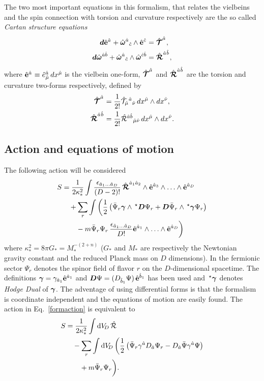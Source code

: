 The two most important equations in this formalism, that relates the vielbeins and the spin connection with torsion and curvature respectively are the so called {\it{Cartan structure equations}} 
\begin{align}
  \label{cartantorsion}
  \df\vifhn{a}{} + \wfh^{\hat{a}}{}_{\hat{c}}\wedge\vifhn{c}{} &= \Tfhn{a}{}, \\
  \label{cartancurvature}
  \df\wfh^{\hat{a}\hat{b}} + \wfh^{\hat{a}}{}_{\hat{c}}\wedge\wfh^{\hat{c}\hat{b}} &= \Rfhn{a}{}{b}{},
\end{align}
where $\hat{{\bf{e}}}^{\hat{a}_{}} \equiv \hat{e}^{\hat{a}}_{\hat{\mu}}\,dx^{\hat{\mu}}$ is the vielbein one-form, $\hat{{\boldsymbol{\mathcal{T}}}}^{\hat{a}_{}}$ and $\hat{{\boldsymbol{\mathcal{R}}}}^{\hat{a}_{}\hat{b}_{}}$ are the torsion and curvature two-forms respectively, defined by
\begin{align}
  \hat{{\boldsymbol{\mathcal{T}}}}^{\hat{a}_{}} &= \frac{1}{2!}\hat{\mathcal{T}}_{\hat{\mu}}{}^{\hat{a}}{}_{\hat{\nu}}\,dx^{\hat{\mu}}\wedge dx^{\hat{\nu}},\\
  \hat{{\boldsymbol{\mathcal{R}}}}^{\hat{a}_{}\hat{b}_{}} &= \frac{1}{2!}\hat{{\mathcal{R}}}^{\hat{a}\hat{b}}{}_{\hat{\mu}\hat{\nu}}\,dx^{\hat{\mu}}\wedge dx^{\hat{\nu}}.
\end{align}


\subsection{Action and equations of motion}
The following action will be considered
\begin{align}
  \nonumber
  S &= \frac{1}{2\kappa_*^2}\int\frac{\epsilon_{\hat{a}_1\ldots\hat{a}_D}}{(D-2)!}\,\Rfh^{\hat{a}_1\hat{a}_2}\wedge\vifh^{\hat{a}_3}\wedge\ldots\wedge\vifh^{\hat{a}_D} \\
  \nonumber
  &\quad+ \sum_{r}\int\bigg(\frac{1}{2}\left(\bar{\Psi}_r\gf\wedge\hodge\Df\Psi_r + \Df\bar{\Psi}_r\wedge\hodge\gf\Psi_r\right) \\
  \label{formaction}
  &\qquad- m\bar{\Psi}_r\Psi_r\,\frac{\epsilon_{\hat{a}_1\ldots\hat{a}_D}}{D!}\vifh^{\hat{a}_1}\wedge\ldots\wedge\vifh^{\hat{a}_D}\bigg)
\end{align}
where $\kappa_*^2 = 8\pi G_* = M_*^{-(2+n)}$ ($G_*$ and $M_*$ are  respectively the  Newtonian gravity constant and the reduced Planck mass on $D$ dimensions). In the fermionic sector $\Psi_r$ denotes the spinor field of flavor $r$ on the $D$-dimensional spacetime. The definitions ${\boldsymbol{\gamma}} = \gamma_{\hat{a}_1}\hat{{\bf{e}}}^{\hat{a}_1}$ and ${\boldsymbol{D}}\Psi = (D_{\hat{b}_1}\Psi)\,\hat{{\bf{e}}}^{\hat{b}_1}$ has been used and $\,{}^\star{\boldsymbol{\gamma}}$ denotes {\it{Hodge Dual}} of ${\boldsymbol{\gamma}}$. The adventage of using differential forms is that the formalism is coordinate independent and the equations of motion are easily found. The action in Eq.~\eqref{formaction} is equivalent to
\begin{align}
  \nonumber
  S &= \frac{1}{2\kappa_*^2}\int \dv[D]\,\hat{\R} \\ 
  \nonumber
  &\quad -\sum_{r}\int \dv[D]\,\bigg(\frac{1}{2}\left(\bar{\Psi}_r\gamma^{\hat{a}}D_{\hat{a}}\Psi_r - D_{\hat{a}}\bar{\Psi}\gamma^{\hat{a}}\Psi\right)\\
  \label{coordinateaction}
  &\qquad + m\bar{\Psi}_r\Psi_r\bigg).
\end{align}

